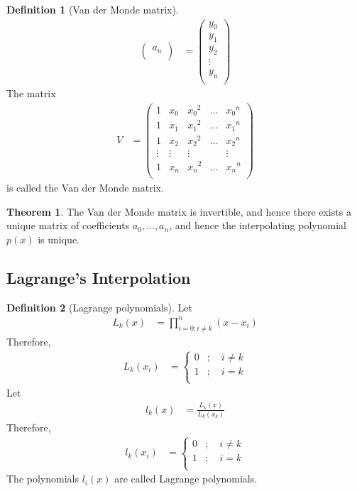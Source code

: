 \documentclass[fleqn, a4paper, 12pt, twoside, titlepage]{article}
\theoremstyle{definition}
\newtheorem{definition}{Definition}
\theoremstyle{theorem}
\newtheorem{theorem}{Theorem}
\begin{document}
\begin{definition}[Van der Monde matrix]
\begin{align*}
\begin{pmatrix}
				a_n    \\
			\end{pmatrix}
		&=
			\begin{pmatrix}
				y_0    \\
				y_1    \\
				y_2    \\
				\vdots \\
				y_n    \\
			\end{pmatrix}
	\end{align*}
	The matrix
	\begin{align*}
		V &=
			\begin{pmatrix}
				1      & x_0    & {x_0}^2 & \dots & {x_0}^n \\
				1      & x_1    & {x_1}^2 & \dots & {x_1}^n \\
				1      & x_2    & {x_2}^2 & \dots & {x_2}^n \\
				\vdots & \vdots & \vdots  &       & \vdots  \\
				1      & x_n    & {x_n}^2 & \dots & {x_n}^n \\
			\end{pmatrix}
	\end{align*}
	is called the Van der Monde matrix.
\end{definition}

\begin{theorem}
	The Van der Monde matrix is invertible, and hence there exists a unique matrix of coefficients $a_0 , \dots , a_n$, and hence the interpolating polynomial $p(x)$ is unique.
\end{theorem}

\subsection{Lagrange's Interpolation}

\begin{definition}[Lagrange polynomials]
	Let
	\begin{align*}
		L_k(x) & = \prod\limits_{i = 0 ; i \neq k}^{n} (x - x_i)
	\end{align*}
	Therefore,
	\begin{align*}
		L_k(x_i) &=
			\begin{cases}
				0 & ;\quad i \neq k \\
				1 & ;\quad i = k    \\
			\end{cases}
	\end{align*}
	Let
	\begin{align*}
		l_k(x) & = \frac{L_k(x)}{L_k(x_k)}
	\end{align*}
	Therefore,
	\begin{align*}
		l_k(x_i) &=
			\begin{cases}
				0 & ;\quad i \neq k \\
				1 & ;\quad i = k    \\
			\end{cases}
	\end{align*}
	The polynomials $l_i(x)$ are called Lagrange polynomials.
\end{definition}
\end{document}
